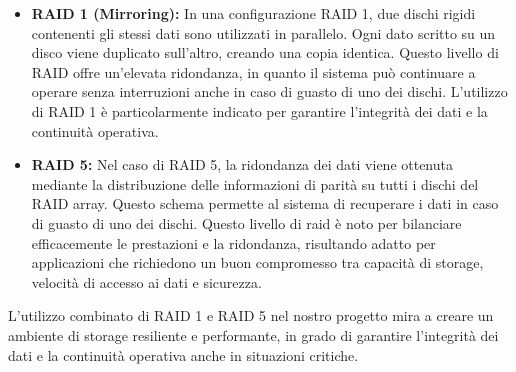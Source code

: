 \documentclass[11pt]{article}
\begin{document}
\begin{itemize}
    \item \textbf{RAID 1 (Mirroring):} In una configurazione RAID 1, due dischi rigidi contenenti gli stessi dati sono utilizzati in parallelo. Ogni dato scritto su un disco viene duplicato sull'altro, creando una copia identica. Questo livello di RAID offre un'elevata ridondanza, in quanto il sistema può continuare a operare senza interruzioni anche in caso di guasto di uno dei dischi. L'utilizzo di RAID 1 è particolarmente indicato per garantire l'integrità dei dati e la continuità operativa.

    \item \textbf{RAID 5:} Nel caso di RAID 5, la ridondanza dei dati viene ottenuta mediante la distribuzione delle informazioni di parità su tutti i dischi del RAID array. Questo schema permette al sistema di recuperare i dati in caso di guasto di uno dei dischi. Questo livello di raid è noto per bilanciare efficacemente le prestazioni e la ridondanza, risultando adatto per applicazioni che richiedono un buon compromesso tra capacità di storage, velocità di accesso ai dati e sicurezza.
\end{itemize}
L'utilizzo combinato di RAID 1 e RAID 5 nel nostro progetto mira a creare un ambiente di storage resiliente e performante, in grado di garantire l'integrità dei dati e la continuità operativa anche in situazioni critiche.
\end{document}

